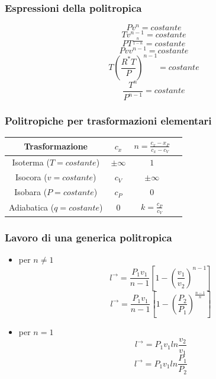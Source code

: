 \subsubsection{Espressioni della politropica}
\[
    Pv^n = costante
\]
\[
    Tv^{n-1} = costante
\]
\[
    PT^{\frac{n}{1-n}} = costante
\]
\[
    Pvv^{n-1} = costante
\]
\[
    T\left(\frac{R^*T}{P}\right)^{n-1}= costante
\]
\[
    \frac{T^n}{P^{n-1}} = costante
\]
\subsubsection{Politropiche per trasformazioni elementari}
\begin{center}
    \begin{tabular}{ |c|c|c|c| } 
    \hline
    Trasformazione & $c_x$ & $n = \frac{c_x - x_P}{c_x - c_V}$ \\
    \hline
    Isoterma ($T = costante$) & $\pm \infty$ & $1$ \\ 
    Isocora ($v = costante$) & $c_V$ & $\pm \infty$\\ 
    Isobara ($P = costante$) & $c_P$ & $0$\\ 
    Adiabatica ($q = costante$) & $0$ & $k= \frac{c_P}{c_V}$\\ 
    \hline
    \end{tabular}
    \end{center}
\subsubsection{Lavoro di una generica politropica}
\begin{itemize}
    \item per $n\neq 1$ 
    \[
        l^\rightarrow = \frac{P_1 v_1}{n-1}\left[1- \left(\frac{v_1}{v_2}\right)^{n-1}\right]
    \]
    \[
        l^\rightarrow = \frac{P_1 v_1}{n-1}\left[1- \left(\frac{P_2}{P_1}\right)^{\frac{n-1}{n}}\right]
    \]
    \item per $n = 1$
    \[
        l^\rightarrow = P_1v_1 ln \frac{v_2}{v_1}
    \]
    \[
        l^\rightarrow = P_1 v_1 ln \frac{P_1}{P_2}
    \]
\end{itemize}

